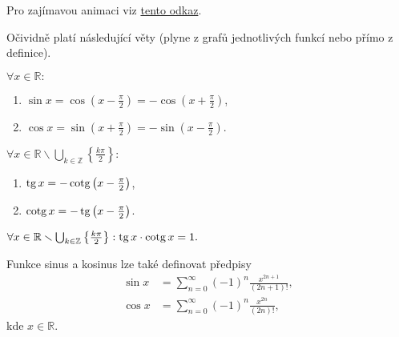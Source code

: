 \begin{pozn}
    Pro zajímavou animaci viz \href{https://upload.wikimedia.org/wikipedia/commons/3/3b/Circle_cos_sin.gif}{tento odkaz}.
\end{pozn}

\begin{pozn}
    Očividně platí následující věty (plyne z grafů jednotlivých funkcí nebo přímo z definice).
\end{pozn}

\begin{veta}
  $\forall x \in \mathbb{R}:$
  \begin{enumerate}[$i.$]
    \item $\sin x = \cos \left(x- \frac{\pi}{2}\right)=-\cos\left(x+\frac{\pi}{2}\right)$,
 	\item $\cos x = \sin \left(x+\frac{\pi}{2}\right)=-\sin \left(x- \frac{\pi}{2} \right)$.
  \end{enumerate}
\end{veta}

\begin{veta}
  $\forall x \in \mathbb{R}\smallsetminus\bigcup_{k\in \mathbb Z} \left \{ \frac{k\pi}{2} \right \} :$
  \begin{enumerate}[$i.$]
    \item $\operatorname{tg} x = -\operatorname{cotg} \left ( x- \frac{\pi}{2} \right )$,
 	\item $\operatorname{cotg} x = -\operatorname{tg} \left ( x- \frac{\pi}{2} \right )$.
  \end{enumerate}
\end{veta}

\begin{veta}
  $\forall x \in \mathbb{R}\smallsetminus\bigcup_{k\in \mathbb Z} \left \{ \frac{k\pi}{2} \right \}: \operatorname{tg} x \cdot \operatorname{cotg} x = 1.$
\end{veta}

\begin{pozn}
    Funkce sinus a kosinus lze také definovat předpisy
    \begin{align*}
        \sin x & = \sum_{n=0}^\infty (-1)^n \frac{x^{2n+1}}{(2n+1)!},\\
        \cos x & = \sum_{n=0}^\infty (-1)^n \frac{x^{2n}}{(2n)!},
    \end{align*}
    kde $x \in \mathbb R.$
\end{pozn}
